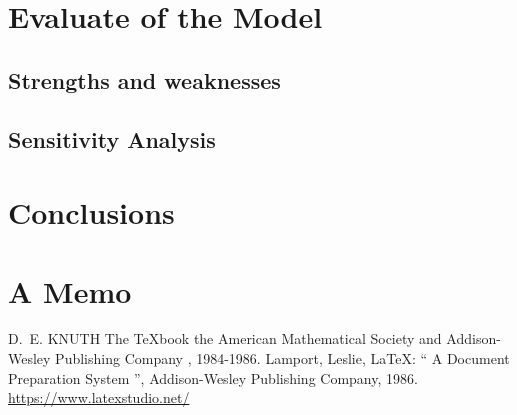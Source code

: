 \documentclass{mcmthesis}
\begin{document}
\section{Evaluate of the Model}
\subsection{Strengths and weaknesses}

\subsection{Sensitivity Analysis}




\section{Conclusions}


\section{A Memo}








\begin{thebibliography}{99}
 D.~E. KNUTH   The \TeX{}book  the American
Mathematical Society and Addison-Wesley
Publishing Company , 1984-1986.
Lamport, Leslie,  \LaTeX{}: `` A Document Preparation System '',
Addison-Wesley Publishing Company, 1986.
\url{https://www.latexstudio.net/}
\end{thebibliography}
\end{document}
